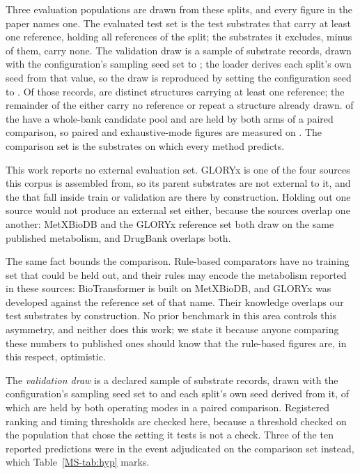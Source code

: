 \documentclass[journal=jcisd8,manuscript=suppinfo,layout=onecolumn]{achemso}
\begin{document}
Three evaluation populations are drawn from these splits, and every figure in the paper names
one. The evaluated test set is the \numPopulationTestsubs{} test substrates that carry at least
one reference, holding all \numPopulationTestrefs{} references of the split; the substrates it
excludes, \numSplitTestSubstrates{} minus \numPopulationTestsubs{} of them, carry none. The
validation draw is a sample of \numValdrawCap{} substrate records, drawn with the configuration's
sampling seed set to \numValdrawSeed{}; the loader derives each split's own seed from that value,
so the draw is reproduced by setting the configuration seed
to \numValdrawSeed{}. Of those records, \numValdrawDeclared{} are distinct structures
carrying at least one reference; the remainder of the \numValdrawCap{} either carry no reference or
repeat a structure already drawn. \numValdrawPaired{} of the \numValdrawDeclared{} have a
whole-bank candidate pool and are held by both arms of a paired comparison, so paired and
exhaustive-mode figures are measured on \numValdrawPaired{}. The comparison set is the
\numPopulationN{} substrates on which
every method predicts.

This work reports no external evaluation set. GLORYx is one of the four sources this corpus is
assembled from, so its \numGloryxN{} parent substrates are not external to it, and the
\numGloryxOverlap{} that fall inside train or validation are there by construction.
Holding out one source would not produce an external set either, because the sources
overlap one another: MetXBioDB and the GLORYx reference set both draw on the same published
metabolism, and DrugBank overlaps both.

The same fact bounds the comparison. Rule-based comparators have no training set that could be
held out, and their rules may encode the metabolism reported in these sources: BioTransformer is
built on MetXBioDB, and GLORYx was developed against the reference set of that name. Their
knowledge overlaps our test substrates by construction. No prior benchmark in this area controls
this asymmetry, and neither does this work; we state it because anyone comparing these numbers to
published ones should know that the rule-based figures are, in this respect, optimistic.


The \emph{validation draw} is a declared sample of \numValdrawCap{} substrate records, drawn with
the configuration's sampling seed set to \numValdrawSeed{} and each split's own seed derived from
it, of which \numValdrawPaired{} are held by both operating modes in a paired
comparison. Registered ranking and timing thresholds are checked here, because a threshold checked
on the population that chose the setting it tests is not a check. Three of the ten reported
predictions were in the event adjudicated on the comparison set instead, which
Table~\ref{MS-tab:hyp} marks.
\end{document}
